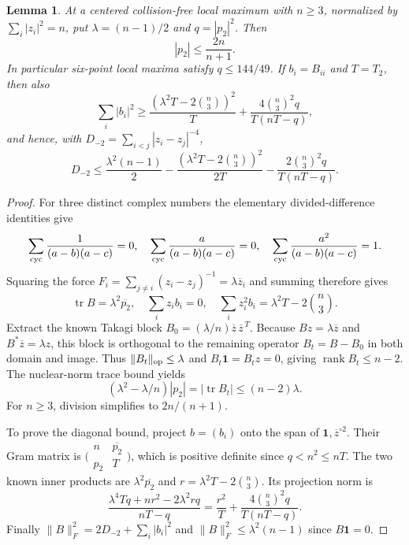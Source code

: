 \documentclass[11pt]{article}
\newtheorem{lemma}[theorem]{Lemma}
\theoremstyle{remark}
\numberwithin{equation}{section}
\begin{document}
\begin{lemma}\label{lem:noorigin-takagi-trace}
At a centered collision-free local maximum with $n\ge3$, normalized
by $\sum_i|z_i|^2=n$, put $\lambda=(n-1)/2$ and $q=|p_2|^2$. Then
\[
                      |p_2|\le\frac{2n}{n+1}.
\]
In particular six-point local maxima satisfy $q\le144/49$.
If $b_i=B_{ii}$ and $T=T_2$, then also
\[
 \sum_i|b_i|^2\ge
 \frac{(\lambda^2T-2\binom n3)^2}{T}
 +\frac{4\binom n3^2q}{T(nT-q)},
\]
and hence, with $D_{-2}=\sum_{i<j}|z_i-z_j|^{-4}$,
\[
 D_{-2}\le\frac{\lambda^2(n-1)}2
 -\frac{(\lambda^2T-2\binom n3)^2}{2T}
 -\frac{2\binom n3^2q}{T(nT-q)}.
\]
\end{lemma}
\begin{proof}
For three distinct complex numbers the elementary divided-difference
identities give
\[
 \sum_{\rm cyc}\frac1{(a-b)(a-c)}=0,\quad
 \sum_{\rm cyc}\frac a{(a-b)(a-c)}=0,\quad
 \sum_{\rm cyc}\frac {a^2}{(a-b)(a-c)}=1.
\]
Squaring the force $F_i=\sum_{j\ne i}(z_i-z_j)^{-1}
=\lambda\overline z_i$ and summing therefore gives
\[
 \operatorname{tr}B=\lambda^2\overline{p_2},\quad
 \sum_i z_i b_i=0,\quad
 \sum_i z_i^2 b_i=\lambda^2T-2\binom n3.
\]
Extract the known Takagi block
$B_0=(\lambda/n)\overline z\,\overline z^{\,T}$.
Because $Bz=\lambda\overline z$ and
$B^*\overline z=\lambda z$, this block is orthogonal to the
remaining operator $B_t=B-B_0$ in both domain and image.
Thus $\|B_t\|_{\rm op}\le\lambda$ and
$B_t\mathbf1=B_tz=0$, giving $\operatorname{rank}B_t\le n-2$.
The nuclear-norm trace bound yields
\[
 (\lambda^2-\lambda/n)|p_2|
       =|\operatorname{tr}B_t|\le(n-2)\lambda.
\]
For $n\ge3$, division simplifies to $2n/(n+1)$.

To prove the diagonal bound, project $b=(b_i)$ onto the span of
$\mathbf1,\overline z^{\circ2}$. Their Gram matrix is
$\bigl(\begin{smallmatrix}n&\overline{p_2}\\p_2&T\end{smallmatrix}\bigr)$,
which is positive definite since $q<n^2\le nT$.
The two known inner products are $\lambda^2\overline{p_2}$ and
$r=\lambda^2T-2\binom n3$. Its projection norm is
\[
 \frac{\lambda^4Tq+nr^2-2\lambda^2rq}{nT-q}
 =\frac{r^2}{T}+\frac{4\binom n3^2q}{T(nT-q)}.
\]
Finally $\|B\|_F^2=2D_{-2}+\sum_i|b_i|^2$ and
$\|B\|_F^2\le\lambda^2(n-1)$ since $B\mathbf1=0$.
\end{proof}
\end{document}
